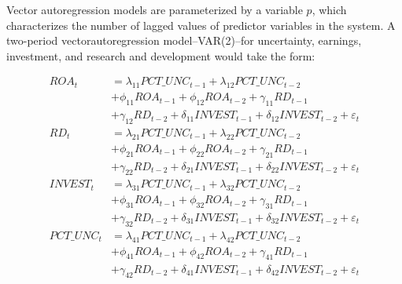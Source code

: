 \documentclass[12pt, letterpaper]{article}
\begin{document}
Vector autoregression models are parameterized by a variable $p$, which characterizes the number of lagged values of predictor variables in the system. 
A two-period vectorautoregression model--VAR(2)--for uncertainty, earnings, investment, and research and development would take the form:

\begin{equation} \label{eq:var2} 
\begin{aligned} 
ROA_{t} &= \lambda_{11}PCT\_UNC_{t-1} +\lambda_{12}PCT\_UNC_{t-2}\\
&+\phi_{11}ROA_{t-1} +\phi_{12}ROA_{t-2} + \gamma_{11}RD_{t-1}\\
&+\gamma_{12}RD_{t-2} + \delta_{11}INVEST_{t-1} + \delta_{12}INVEST_{t-2} + \varepsilon_{t} \\
RD_{t} &= \lambda_{21}PCT\_UNC_{t-1} +\lambda_{22}PCT\_UNC_{t-2}\\
&+\phi_{21}ROA_{t-1} +\phi_{22}ROA_{t-2} +\gamma_{21}RD_{t-1}\\
&+\gamma_{22}RD_{t-2}+ \delta_{21}INVEST_{t-1} +\delta_{22}INVEST_{t-2} + \varepsilon_{t} \\
INVEST_{t} &= \lambda_{31}PCT\_UNC_{t-1} +\lambda_{32}PCT\_UNC_{t-2}\\
&+\phi_{31}ROA_{t-1} +\phi_{32}ROA_{t-2} +\gamma_{31}RD_{t-1}\\
&+\gamma_{32}RD_{t-2}+\delta_{31}INVEST_{t-1} +\delta_{32}INVEST_{t-2} + \varepsilon_{t}\\
PCT\_UNC_{t} &= \lambda_{41}PCT\_UNC_{t-1} +\lambda_{42}PCT\_UNC_{t-2}\\
&+\phi_{41}ROA_{t-1} +\phi_{42}ROA_{t-2} + \gamma_{41}RD_{t-1}\\
&+\gamma_{42}RD_{t-2} + \delta_{41}INVEST_{t-1} + \delta_{42}INVEST_{t-2} + \varepsilon_{t} \\
\end{aligned}
\end{equation}
\end{document}
